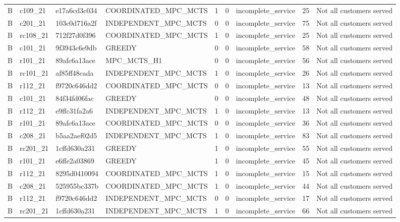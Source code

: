 \begin{table}
{\begin{tabular}{llllrrlrl}
B & c109\_21 & e17a6cd3c034 & COORDINATED\_MPC\_MCTS & 1 & 0 & incomplete\_service & 25 & Not all customers served \\
B & c201\_21 & 103c0d716a2f & INDEPENDENT\_MPC\_MCTS & 0 & 0 & incomplete\_service & 75 & Not all customers served \\
B & rc108\_21 & 712f27d0f396 & COORDINATED\_MPC\_MCTS & 1 & 0 & incomplete\_service & 25 & Not all customers served \\
B & c101\_21 & 9f3943c6e9db & GREEDY & 0 & 0 & incomplete\_service & 58 & Not all customers served \\
B & r101\_21 & 89afc6a13ace & MPC\_MCTS\_H1 & 0 & 0 & incomplete\_service & 56 & Not all customers served \\
B & rc101\_21 & af85ff48cada & INDEPENDENT\_MPC\_MCTS & 1 & 0 & incomplete\_service & 26 & Not all customers served \\
B & r112\_21 & f9720c646dd2 & COORDINATED\_MPC\_MCTS & 0 & 0 & incomplete\_service & 13 & Not all customers served \\
B & c101\_21 & 84f34fd06fac & GREEDY & 0 & 0 & incomplete\_service & 48 & Not all customers served \\
B & r112\_21 & e9ffc31fa2a6 & INDEPENDENT\_MPC\_MCTS & 1 & 0 & incomplete\_service & 13 & Not all customers served \\
B & r101\_21 & 89afc6a13ace & COORDINATED\_MPC\_MCTS & 0 & 0 & incomplete\_service & 36 & Not all customers served \\
B & c208\_21 & b5aa2aef02d5 & INDEPENDENT\_MPC\_MCTS & 1 & 0 & incomplete\_service & 83 & Not all customers served \\
B & rc201\_21 & 1cffd630a231 & GREEDY & 1 & 0 & incomplete\_service & 55 & Not all customers served \\
B & r101\_21 & e6ffe2a03869 & GREEDY & 1 & 0 & incomplete\_service & 45 & Not all customers served \\
B & r112\_21 & 8295d0410094 & COORDINATED\_MPC\_MCTS & 1 & 0 & incomplete\_service & 15 & Not all customers served \\
B & c208\_21 & 525955bc337b & COORDINATED\_MPC\_MCTS & 1 & 0 & incomplete\_service & 44 & Not all customers served \\
B & r112\_21 & f9720c646dd2 & INDEPENDENT\_MPC\_MCTS & 0 & 0 & incomplete\_service & 17 & Not all customers served \\
B & rc201\_21 & 1cffd630a231 & INDEPENDENT\_MPC\_MCTS & 1 & 0 & incomplete\_service & 66 & Not all customers served \\

\end{tabular}}
\end{table}
